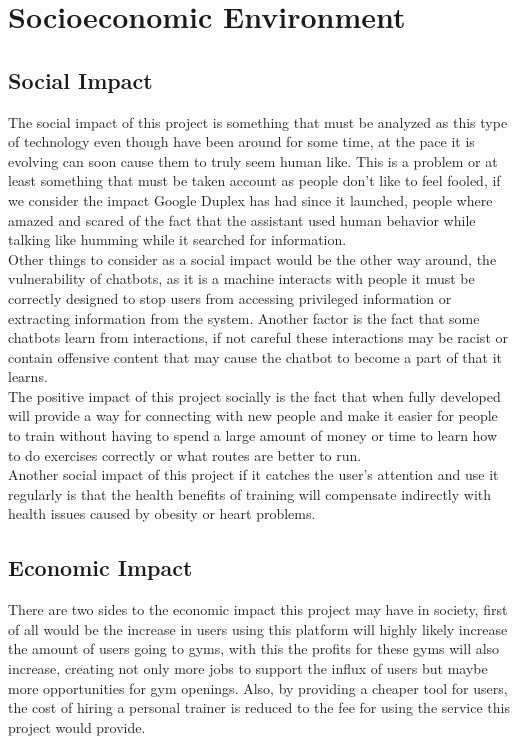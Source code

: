 \section{Socioeconomic Environment}\label{sec:chap2_socio_frame}
\subsection{Social Impact}\label{sec:chap6_soc}

The social impact of this project is something that must be analyzed as this type of technology even though have been around for some time, at the pace it is evolving can soon cause them to truly seem human like. This is a problem or at least something that must be taken account as people don’t like to feel fooled, if we consider the impact Google Duplex has had since it launched, people where amazed and scared of the fact that the assistant used human behavior while talking like humming while it searched for information.\\

Other things to consider as a social impact would be the other way around, the vulnerability of chatbots, as it is a machine interacts with people it must be correctly designed to stop users from accessing privileged information or extracting information from the system. Another factor is the fact that some chatbots learn from interactions, if not careful these interactions may be racist or contain offensive content that may cause the chatbot to become a part of that it learns.\\

The positive impact of this project socially is the fact that when fully developed will provide a way for connecting with new people and make it easier for people to train without having to spend a large amount of money or time to learn how to do exercises correctly or what routes are better to run.\\

Another social impact of this project if it catches the user’s attention and use it regularly is that the health benefits of training will compensate indirectly with health issues caused by obesity or heart problems.


\subsection{Economic Impact}\label{sec:chap6_eco}

There are two sides to the economic impact this project may have in society, first of all would be the increase in users using this platform will highly likely increase the amount of users going to gyms, with this the profits for these gyms will also increase, creating not only more jobs to support the influx of users but maybe more opportunities for gym openings. Also, by providing a cheaper tool for users, the cost of hiring a personal trainer is reduced to the fee for using the service this project would provide.\\

